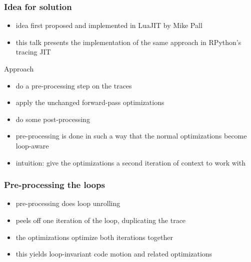 \documentclass[utf8x]{beamer}
\begin{document}
\begin{frame}
  \frametitle{Idea for solution}
  \begin{itemize}
      \item idea first proposed and implemented in LuaJIT by Mike Pall
      \item this talk presents the implementation of the same approach in RPython's tracing JIT
  \end{itemize}
  \pause
  \begin{block}{Approach}
      \begin{itemize}
          \item do a pre-processing step on the traces
          \item apply the unchanged forward-pass optimizations
          \item do some post-processing
          \item pre-processing is done in such a way that the normal optimizations become loop-aware
          \pause
          \item intuition: give the optimizations a second iteration of context to work with
      \end{itemize}
  \end{block}
\end{frame}

\begin{frame}
  \frametitle{Pre-processing the loops}
  \begin{itemize}
      \item pre-processing does loop unrolling
      \item peels off one iteration of the loop, duplicating the trace
      \item the optimizations optimize both iterations together
      \item this yields loop-invariant code motion and related optimizations
  \end{itemize}
\end{frame}
\end{document}
